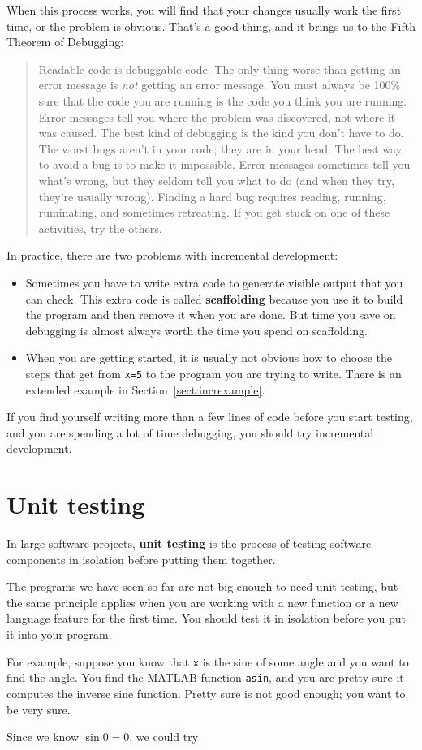 \documentclass[
]{book}
\newcommand{\displaythrm}[1]{%
    \ifthenelse{\equal{#1}{1}}%
        {Readable code is debuggable code.}{%
    \ifthenelse{\equal{#1}{2}}%
        {The only thing worse than getting an error message is {\em
         not} getting an error message.}{%
    \ifthenelse{\equal{#1}{3}}%
        {You must always be 100\% sure that the code you are running
         is the code you think you are running.}{%
    \ifthenelse{\equal{#1}{4}}%
        {Error messages tell you where the problem was discovered,
         not where it was caused.}{%
    \ifthenelse{\equal{#1}{5}}%
        {The best kind of debugging is the kind you don't have to do.}{%
    \ifthenelse{\equal{#1}{6}}%
        {The worst bugs aren't in your code; they are in your head.}{%
    \ifthenelse{\equal{#1}{7}}%
        {The best way to avoid a bug is to make it impossible.}{%
    \ifthenelse{\equal{#1}{8}}%
        {Error messages sometimes tell you what's wrong, but they
         seldom tell you what to do (and when they try, they're usually
         wrong).}{%
    \ifthenelse{\equal{#1}{9}}%
        {Finding a hard bug requires reading, running, ruminating,
         and sometimes retreating.  If you get stuck on one of these
         activities, try the others.}{%
    {}%
}}}}}}}}}}%
\begin{document}
When this process works, you will find that your changes usually
work the first time, or the problem is obvious.  That's a good thing,
and it brings us to the Fifth Theorem of Debugging:

\begin{quote}
\displaythrm{5}
\end{quote}

In practice, there are two problems with incremental development:

\begin{itemize}

\item Sometimes you have to write extra code to
generate visible output that you can check.  This extra code is
called {\bf scaffolding} because you use it to build the program
and then remove it when you are done.  But time you save on
debugging is almost always worth the time you spend on
scaffolding.

\item When you are getting started, it is usually not obvious how to
choose the steps that get from {\tt x=5} to the program you are trying
to write.  There is an extended example in Section~\ref{sect:increxample}.

\end{itemize}

If you find yourself writing more than a few lines of code before
you start testing, and you are spending a lot of time debugging,
you should try incremental development.


\section{Unit testing}

In large software projects, {\bf unit testing} is the process of
testing software components in isolation before putting
them together.

The programs we have seen so far are not
big enough to need unit testing, but the same principle applies
when you are working with a new function or a new language feature
for the first time.  You should test it in isolation before you
put it into your program.

For example, suppose you know that {\tt x} is the sine of some
angle and you want to find the angle.  You find the MATLAB function
{\tt asin}, and you are pretty sure it computes the inverse sine
function.  Pretty sure is not good enough; you want to be very sure.

Since we know $\sin 0 = 0$, we could try
\end{document}
